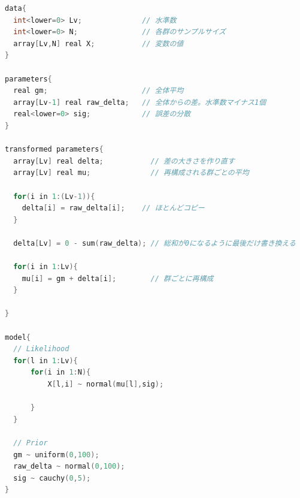 \begin{lstlisting}[language=C++,label={stan::21_05},caption={群の数を一般化したコード}]
data{
  int<lower=0> Lv;              // 水準数
  int<lower=0> N;               // 各群のサンプルサイズ       
  array[Lv,N] real X;           // 変数の値
}

parameters{
  real gm;                      // 全体平均
  array[Lv-1] real raw_delta;   // 全体からの差。水準数マイナス1個
  real<lower=0> sig;            // 誤差の分散
}

transformed parameters{
  array[Lv] real delta;           // 差の大きさを作り直す
  array[Lv] real mu;              // 再構成される群ごとの平均
  
  for(i in 1:(Lv-1)){
    delta[i] = raw_delta[i];    // ほとんどコピー
  }
  
  delta[Lv] = 0 - sum(raw_delta); // 総和が0になるように最後だけ書き換える

  for(i in 1:Lv){
    mu[i] = gm + delta[i];        // 群ごとに再構成
  }
  
}

model{
  // Likelihood
  for(l in 1:Lv){
      for(i in 1:N){
          X[l,i] ~ normal(mu[l],sig);
          
      }
  }
    
  // Prior
  gm ~ uniform(0,100);
  raw_delta ~ normal(0,100);
  sig ~ cauchy(0,5);
}

\end{lstlisting}
